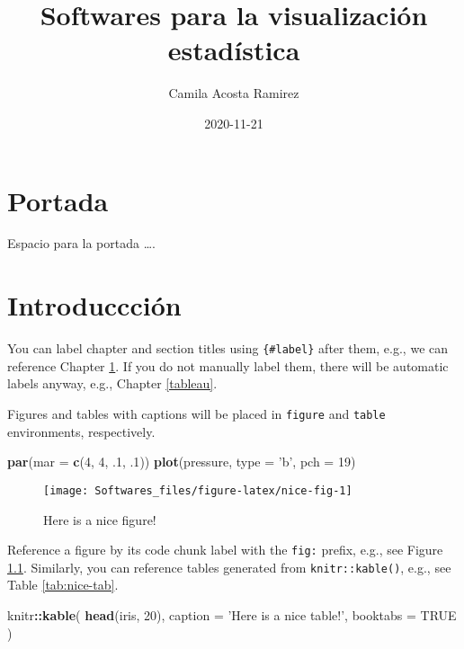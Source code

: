 \documentclass[
]{book}
\title{Softwares para la visualización estadística}
\author{Camila Acosta Ramirez}
\date{2020-11-21}
\newenvironment{Shaded}{\begin{snugshade}}{\end{snugshade}}
\newcommand{\DataTypeTok}[1]{\textcolor[rgb]{0.13,0.29,0.53}{#1}}
\newcommand{\DecValTok}[1]{\textcolor[rgb]{0.00,0.00,0.81}{#1}}
\newcommand{\FloatTok}[1]{\textcolor[rgb]{0.00,0.00,0.81}{#1}}
\newcommand{\KeywordTok}[1]{\textcolor[rgb]{0.13,0.29,0.53}{\textbf{#1}}}
\newcommand{\NormalTok}[1]{#1}
\newcommand{\OperatorTok}[1]{\textcolor[rgb]{0.81,0.36,0.00}{\textbf{#1}}}
\newcommand{\OtherTok}[1]{\textcolor[rgb]{0.56,0.35,0.01}{#1}}
\newcommand{\StringTok}[1]{\textcolor[rgb]{0.31,0.60,0.02}{#1}}
\begin{document}
\maketitle

{
\setcounter{tocdepth}{1}
\tableofcontents
}
\hypertarget{portada}{%
\chapter*{Portada}\label{portada}}

Espacio para la portada \ldots.

\hypertarget{intro}{%
\chapter{Introduccción}\label{intro}}

You can label chapter and section titles using \texttt{\{\#label\}} after them, e.g., we can reference Chapter \ref{intro}. If you do not manually label them, there will be automatic labels anyway, e.g., Chapter \ref{tableau}.

Figures and tables with captions will be placed in \texttt{figure} and \texttt{table} environments, respectively.

\begin{Shaded}
\begin{Highlighting}[]
\KeywordTok{par}\NormalTok{(}\DataTypeTok{mar =} \KeywordTok{c}\NormalTok{(}\DecValTok{4}\NormalTok{, }\DecValTok{4}\NormalTok{, }\FloatTok{.1}\NormalTok{, }\FloatTok{.1}\NormalTok{))}
\KeywordTok{plot}\NormalTok{(pressure, }\DataTypeTok{type =} \StringTok{'b'}\NormalTok{, }\DataTypeTok{pch =} \DecValTok{19}\NormalTok{)}
\end{Highlighting}
\end{Shaded}

\begin{figure}

{\centering \texttt{[image: Softwares\_files/figure-latex/nice-fig-1]} 

}

\caption{Here is a nice figure!}\label{fig:nice-fig}
\end{figure}

Reference a figure by its code chunk label with the \texttt{fig:} prefix, e.g., see Figure \ref{fig:nice-fig}. Similarly, you can reference tables generated from \texttt{knitr::kable()}, e.g., see Table \ref{tab:nice-tab}.

\begin{Shaded}
\begin{Highlighting}[]
\NormalTok{knitr}\OperatorTok{::}\KeywordTok{kable}\NormalTok{(}
  \KeywordTok{head}\NormalTok{(iris, }\DecValTok{20}\NormalTok{), }\DataTypeTok{caption =} \StringTok{'Here is a nice table!'}\NormalTok{,}
  \DataTypeTok{booktabs =} \OtherTok{TRUE}
\NormalTok{)}
\end{Highlighting}
\end{Shaded}
\end{document}
